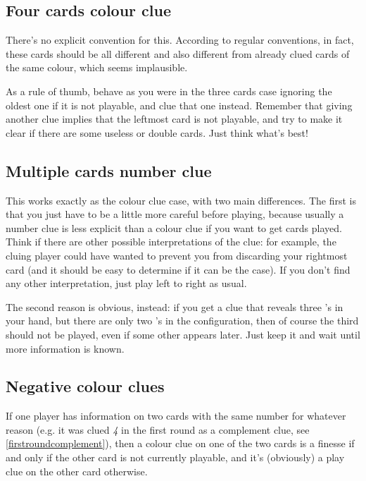 \documentclass[a4paper]{article}
\theoremstyle{plain}
\theoremstyle{definition}
\begin{document}
\subsection{Four cards colour clue}

There's no explicit convention for this. According to regular conventions, in fact, these cards should be all different and also different from already clued cards of the same colour, which seems implausible.

As a rule of thumb, behave as you were in the three cards case ignoring the oldest one if it is not playable, and clue that one instead. Remember that giving another clue implies that the leftmost card is not playable, and try to make it clear if there are some useless or double cards. Just think what's best!

\subsection{Multiple cards number clue}

This works exactly as the colour clue case, with two main differences. The first is that you just have to be a little more careful before playing, because usually a number clue is less explicit than a colour clue if you want to get cards played. Think if there are other possible interpretations of the clue: for example, the cluing player could have wanted to prevent you from discarding your rightmost card (and it should be easy to determine if it can be the case). If you don't find any other interpretation, just play left to right as usual.

The second reason is obvious, instead: if you get a clue that reveals three 's in your hand, but there are only two 's in the configuration, then of course the third  should not be played, even if some other  appears later. Just keep it and wait until more information is known.

\subsection{Negative colour clues}

If one player has information on two cards with the same number for whatever reason (e.g. it was clued \textit{4} in the first round as a complement clue, see \ref{firstroundcomplement}), then a colour clue on one of the two cards is a finesse if and only if the other card is not currently playable, and it's (obviously) a play clue on the other card otherwise.
\end{document}
